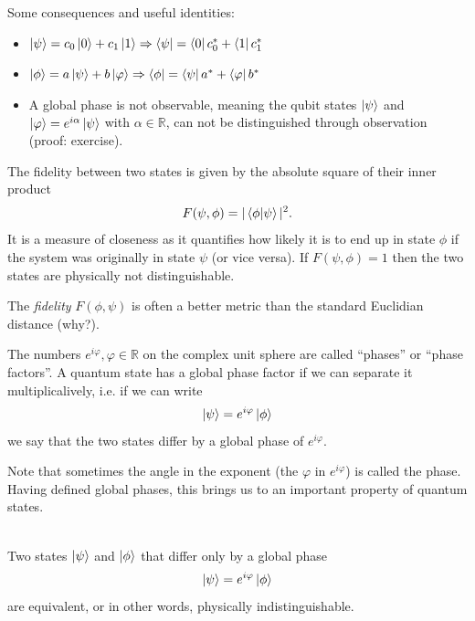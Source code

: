 Some consequences and useful identities:
\begin{itemize}
    \item $\ket{\psi} = c_0\ket{0} + c_1\ket{1} \Rightarrow \bra{\psi} = \bra{0} c_0^* + \bra{1} c_1^* $
    \item $\ket{\phi} = a\ket{\psi} + b\ket{\varphi} \Rightarrow \bra{\phi} = \bra{\psi}a^* + \bra{\varphi}b^*  $
    \item A global phase is not observable, meaning the qubit states $\ket{\psi}$ and $\ket{\varphi}= e^{i\alpha} \ket{\psi}$ with $\alpha \in \mathbb{R}$, can not be distinguished through observation (proof: exercise).
\end{itemize}
\begin{def*}[fidelity]
The fidelity between two states is given by the absolute square of their inner product 
\begin{align}
    F(\psi,\phi) = |\braket{\phi}{\psi}|^2.
\end{align}
It is a measure of closeness as it quantifies how likely it is to end up in state $\phi$ if the system was originally in state $\psi$ (or vice versa). If $F(\psi,\phi)=1$ then the two states are physically not distinguishable.
\end{def*}
The \textit{fidelity} $F(\phi, \psi)$ is often a better metric than the standard Euclidian distance (why?).
\begin{def*}
The numbers $e^{i\varphi}, \varphi\in\mathbb{R}$ on the complex unit sphere are called ``phases'' or ``phase factors''. A quantum state has a global phase factor if we can separate it multiplicalively, i.e. if we can write
\begin{align}
    \ket{\psi} = e^{i\varphi}\ket{\phi}
\end{align}
we say that the two states differ by a global phase of $e^{i\varphi}$.
\end{def*}
Note that sometimes the angle in the exponent (the $\varphi$ in $e^{i\varphi}$) is called the phase. 
Having defined global phases, this brings us to an important property of quantum states.
\begin{theorem*}\phantom{...}\\
    Two states $\ket{\psi}$ and $\ket{\phi}$ that differ only by a global phase
    \begin{align}
        \ket{\psi} = e^{i\varphi} \ket{\phi}
    \end{align}
    are equivalent, or in other words, physically indistinguishable. 
\end{theorem*}
